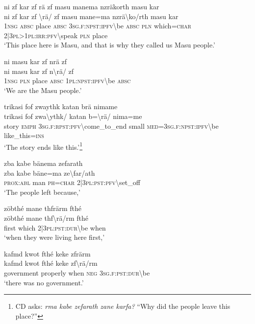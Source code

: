 \ea\label{ex:2:a1694}
ni zf kar zf rä zf masu manema nzräkorth masu kar\\
\gll ni	zf	kar	zf	{\textbackslash}rä/	zf	masu	mane=ma	nzrä{\textbackslash}ko/rth	masu	kar\\
     1\textsc{nsg}	\textsc{absc}	place	\textsc{absc}	3\textsc{sg}.\textsc{f}:\textsc{npst}:\textsc{ipfv}{\textbackslash}be	\textsc{absc}	\textsc{pln}	which=\textsc{char}	2|3\textsc{pl}>1\textsc{pl}:\textsc{irr}:\textsc{pfv}{\textbackslash}speak	\textsc{pln}	place\\
\glt `This place here is Masu, and that is why they called us Masu people.'
\z

\ea\label{ex:2:a1695}
ni masu kar zf nrä zf\\
\gll ni	masu	kar	zf	n{\textbackslash}rä/	zf\\
     1\textsc{nsg}	\textsc{pln}	place	\textsc{absc}	1\textsc{pl}:\textsc{npst}:\textsc{ipfv}{\textbackslash}be	\textsc{absc}\\
\glt `We are the Masu people.'
\z

\ea\label{ex:2:a1696}
trikasi fof zwaythk katan brä nimame\\
\gll trikasi	fof	zwa{\textbackslash}ythk/	katan	b={\textbackslash}rä/	nima=me\\
     story	\textsc{emph}	3\textsc{sg}.\textsc{f}:\textsc{rpst}:\textsc{pfv}{\textbackslash}come\_to\_end	small	\textsc{med}=3\textsc{sg}.\textsc{f}:\textsc{npst}:\textsc{ipfv}{\textbackslash}be	like\_this=\textsc{ins}\\
\glt `The story ends like this.'\footnote{CD asks: \textit{rma kabe zefarath zane karfa?} ``Why did the people leave this place?''}
\z

\ea\label{ex:2:a1698}
zba kabe bänema zefarath\\
\gll zba	kabe	bäne=ma	ze{\textbackslash}far/ath\\
     \textsc{prox}:\textsc{abl}	man	\textsc{ph}=\textsc{char}	2|3\textsc{pl}:\textsc{pst}:\textsc{pfv}{\textbackslash}set\_off\\
\glt `The people left because,'
\z

\ea\label{ex:2:a1699}
zöbthé mane thfrärm fthé\\
\gll zöbthé	mane	thf{\textbackslash}rä/rm	fthé\\
     first	which	2|3\textsc{pl}:\textsc{pst}:\textsc{dur}{\textbackslash}be	when\\
\glt `when they were living here first,'
\z

\ea\label{ex:2:a1700}
kafmd kwot fthé keke zfrärm\\
\gll kafmd	kwot	fthé	keke	zf{\textbackslash}rä/rm\\
     government	properly	when	\textsc{neg}	3\textsc{sg}.\textsc{f}:\textsc{pst}:\textsc{dur}{\textbackslash}be\\
\glt `there was no government.'
\z

